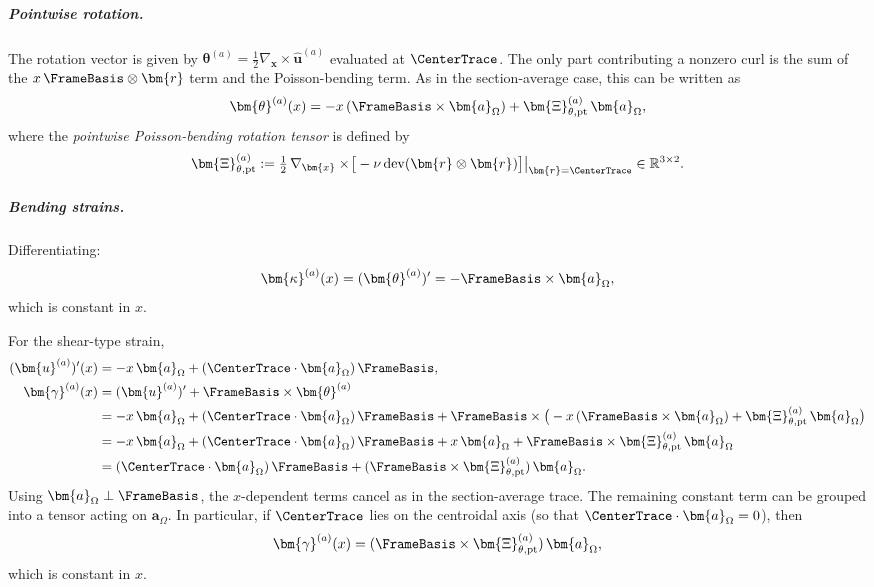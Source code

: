 \subparagraph{Pointwise rotation.}
The rotation vector is given by 
$\bm{\theta}^{(a)} = \tfrac{1}{2}\nabla_{\bm{x}}\times\hat{\bm{u}}^{(a)}$ 
evaluated at $\CenterTrace$. The only part contributing 
a nonzero curl is the sum of the $x\,\FrameBasis\otimes\bm{r}$ term and the 
Poisson-bending term. As in the section-average case, this can be written as
\begin{equation}
\bm{\theta}^{(a)}(x)
=
-x\,(\FrameBasis \times \bm{a}_\Omega)
+ \bm{\Xi}^{(a)}_{\theta,\mathrm{pt}}\,\bm{a}_\Omega,
\label{eq:theta-a-pt}
\end{equation}
where the \emph{pointwise Poisson-bending rotation tensor} is defined by
\begin{equation}
\bm{\Xi}^{(a)}_{\theta,\mathrm{pt}} 
:= \tfrac{1}{2}\,\nabla_{\bm{x}}\times\!\big[-\nu\,\mathrm{dev}(\bm{r} \otimes \bm{r})\big]
\big|_{\bm{r}=\CenterTrace}
\in \mathbb{R}^{3\times 2}.
\end{equation}

\subparagraph{Bending strains.}
Differentiating:
\begin{equation*}
\bm{\kappa}^{(a)}(x)
= (\bm{\theta}^{(a)})' 
= -\FrameBasis \times \bm{a}_\Omega,
\end{equation*}
which is constant in $x$.

For the shear-type strain,
\begin{align*}
(\bm{u}^{(a)})'(x)
&=
-x\,\bm{a}_\Omega + (\CenterTrace\cdot\bm{a}_\Omega)\,\FrameBasis, \\
\bm{\gamma}^{(a)}(x)
&=
(\bm{u}^{(a)})' + \FrameBasis \times \bm{\theta}^{(a)} \\
&=
-x\,\bm{a}_\Omega + (\CenterTrace\cdot\bm{a}_\Omega)\,\FrameBasis 
+ \FrameBasis \times\big(-x\,(\FrameBasis \times \bm{a}_\Omega) 
+ \bm{\Xi}^{(a)}_{\theta,\mathrm{pt}}\,\bm{a}_\Omega\big) \\
&=
-x\,\bm{a}_\Omega + (\CenterTrace\cdot\bm{a}_\Omega)\,\FrameBasis 
+ x\,\bm{a}_\Omega + \FrameBasis \times \bm{\Xi}^{(a)}_{\theta,\mathrm{pt}}\,\bm{a}_\Omega \\
&=
(\CenterTrace\cdot\bm{a}_\Omega)\,\FrameBasis 
+ (\FrameBasis \times \bm{\Xi}^{(a)}_{\theta,\mathrm{pt}})\,\bm{a}_\Omega.
\end{align*}
Using $\bm{a}_\Omega \perp \FrameBasis$, the $x$-dependent terms cancel as in 
the section-average trace. The remaining constant term can be grouped into a 
tensor acting on $\bm{a}_\Omega$. In particular, if 
$\CenterTrace$ lies on the centroidal axis (so that 
$\CenterTrace\cdot\bm{a}_\Omega = 0$), then
\begin{equation*}
\bm{\gamma}^{(a)}(x)
=
(\FrameBasis \times \bm{\Xi}^{(a)}_{\theta,\mathrm{pt}})\,\bm{a}_\Omega,
\end{equation*}
which is constant in $x$.

